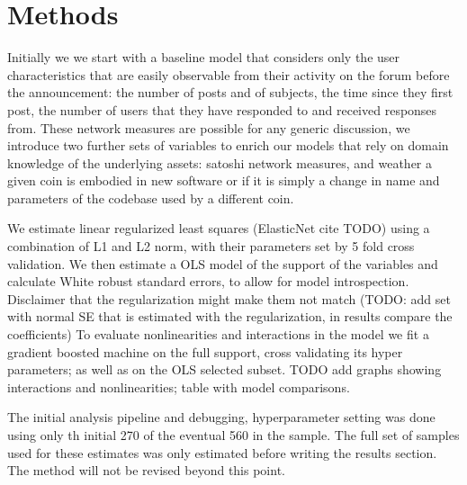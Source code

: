 
\section{Methods }

Initially we we start with a baseline model that considers only the user characteristics that are easily observable from their activity on the forum before the announcement: the number of posts and of subjects,  the time since they first post, the number of users that they have responded to and received responses from. 
These network measures are possible for any generic discussion, we introduce two further sets of variables to enrich our models that rely on domain knowledge of the underlying assets: satoshi network measures, and weather a given coin is embodied in new software or if it is simply a change in name and parameters of the codebase used by a different coin.

We estimate linear regularized least squares (ElasticNet cite TODO) using a combination of L1 and L2 norm, with their parameters set by 5 fold cross validation. 
We then estimate a OLS model of the support of the variables and calculate White robust standard errors, to allow for model introspection. 
Disclaimer that the regularization might make them not match (TODO: add set with normal SE that is estimated with the regularization, in results compare the coefficients) 
To evaluate nonlinearities and interactions  in the model we fit a gradient boosted machine on the full support, cross validating its hyper parameters; as well as on the OLS selected subset.  TODO add graphs showing interactions and nonlinearities; table with model comparisons.


The initial analysis pipeline and debugging, hyperparameter setting was done using only th initial 270 of the eventual 560 in the sample. The full set of samples used for these estimates was only estimated before writing the results section. The method will not be revised beyond this point.

